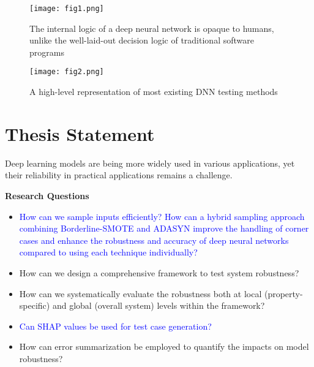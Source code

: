 \begin{figure*}[h]
	\centering
	\texttt{[image: fig1.png]}
	\caption{The internal logic of a deep neural network is opaque to humans, unlike the well-laid-out decision logic of traditional software programs \cite{Intro_1}}
	\label{fig:1}
\end{figure*}

\begin{figure*}[h]
	\centering
	\texttt{[image: fig2.png]}
	\caption{A high-level representation of most existing DNN testing methods \cite{Intro_1}}
	\label{fig:2}
\end{figure*}



\section{Thesis Statement}

Deep learning models are being more widely used in various applications, yet their reliability in practical applications remains a challenge.


  \smallskip\noindent%
  \textbf{Research Questions}\hypertarget{researchquestions}{}
  
  \begin{itemize}
      \item \textcolor{blue}{How can we sample inputs efficiently? How can a hybrid sampling approach combining Borderline-SMOTE and ADASYN improve the handling of corner cases and enhance the robustness and accuracy of deep neural networks compared to using each technique individually?}
      \item How can we design a comprehensive framework to test system robustness?
      \item How can we systematically evaluate the robustness both at local (property-specific) and global (overall system) levels within the framework?
      \item \textcolor{blue}{Can SHAP values be used for test case generation?}
      \item How can error summarization be employed to quantify the impacts on model robustness?
  \end{itemize}
  
  
